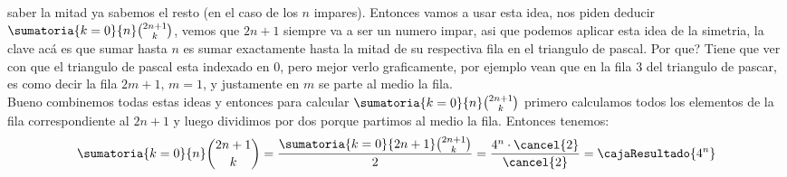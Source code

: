 \begin{enumerate}[label=\alph*)]
        saber la mitad ya sabemos el resto (en el caso de los $n$ impares). Entonces vamos a usar esta idea, nos piden deducir $\sumatoria{k = 0}{n} \binom{2n + 1}{k}$, vemos 
        que $2n + 1$ siempre va a ser un numero impar, asi que podemos aplicar esta idea de la simetria, la clave acá es que sumar hasta $n$ es sumar exactamente
        hasta la mitad de su respectiva fila en el triangulo de pascal. Por que? Tiene que ver con que el triangulo de pascal esta indexado en 0, pero mejor
        verlo graficamente, por ejemplo vean que en la fila 3 del triangulo de pascar, es como decir la fila $2m + 1,\, m=1$, y justamente en $m$ se parte al medio
        la fila. \\
        Bueno combinemos todas estas ideas y entonces para calcular $\sumatoria{k = 0}{n} \binom{2n + 1}{k}$ primero calculamos todos los elementos de la fila correspondiente
        al $2n + 1$ y luego dividimos por dos porque partimos al medio la fila. Entonces tenemos:
        \[
        \sumatoria{k = 0}{n} \binom{2n + 1}{k} = \frac{\sumatoria{k = 0}{2n + 1} \binom{2n + 1}{k}}{2} = \frac{4^n \cdot \cancel{2}}{\cancel{2}} = \cajaResultado{4^n}
        \]

\end{enumerate}

\begin{aportes}
  \item {}
  \item {}
\end{aportes}
